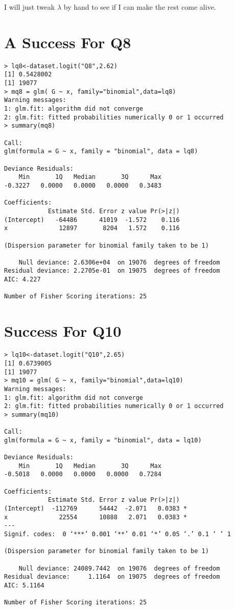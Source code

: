 \documentclass{amsart}
\begin{document}
I will just tweak $\lambda$ by hand to see if I can make the rest come alive.

\section{A Success For Q8}

\begin{verbatim}
> lq8<-dataset.logit("Q8",2.62)
[1] 0.5428002
[1] 19077
> mq8 = glm( G ~ x, family="binomial",data=lq8)
Warning messages:
1: glm.fit: algorithm did not converge 
2: glm.fit: fitted probabilities numerically 0 or 1 occurred 
> summary(mq8)

Call:
glm(formula = G ~ x, family = "binomial", data = lq8)

Deviance Residuals: 
    Min       1Q   Median       3Q      Max  
-0.3227   0.0000   0.0000   0.0000   0.3483  

Coefficients:
            Estimate Std. Error z value Pr(>|z|)
(Intercept)   -64486      41019  -1.572    0.116
x              12897       8204   1.572    0.116

(Dispersion parameter for binomial family taken to be 1)

    Null deviance: 2.6306e+04  on 19076  degrees of freedom
Residual deviance: 2.2705e-01  on 19075  degrees of freedom
AIC: 4.227

Number of Fisher Scoring iterations: 25
\end{verbatim}

\section{Success For Q10}

\begin{verbatim}
> lq10<-dataset.logit("Q10",2.65)
[1] 0.6739005
[1] 19077
> mq10 = glm( G ~ x, family="binomial",data=lq10)
Warning messages:
1: glm.fit: algorithm did not converge 
2: glm.fit: fitted probabilities numerically 0 or 1 occurred 
> summary(mq10)

Call:
glm(formula = G ~ x, family = "binomial", data = lq10)

Deviance Residuals: 
    Min       1Q   Median       3Q      Max  
-0.5018   0.0000   0.0000   0.0000   0.7284  

Coefficients:
            Estimate Std. Error z value Pr(>|z|)  
(Intercept)  -112769      54442  -2.071   0.0383 *
x              22554      10888   2.071   0.0383 *
---
Signif. codes:  0 ‘***’ 0.001 ‘**’ 0.01 ‘*’ 0.05 ‘.’ 0.1 ‘ ’ 1

(Dispersion parameter for binomial family taken to be 1)

    Null deviance: 24089.7442  on 19076  degrees of freedom
Residual deviance:     1.1164  on 19075  degrees of freedom
AIC: 5.1164

Number of Fisher Scoring iterations: 25
\end{verbatim}
\end{document}
